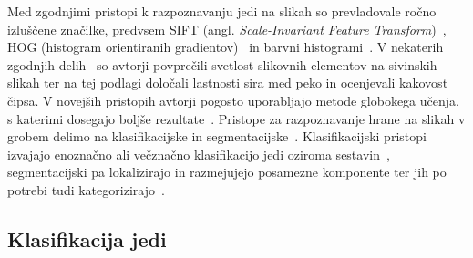 \documentclass[a4paper,twoside,openright,12pt,slovene]{book}
\begin{document}
        Med zgodnjimi pristopi k razpoznavanju jedi na slikah so prevladovale
        ročno izluščene značilke, predvsem SIFT (angl. \emph{Scale-Invariant
        Feature Transform})~\cite{src:lowe2004sift}, HOG (histogram
        orientiranih gradientov)~\cite{src:dalal2005hog} in barvni
        histogrami~\cite{src:min2019survey}.
        V nekaterih zgodnjih delih~\cite{src:wang2003assessment,
        src:segnini1999low} so avtorji povprečili svetlost slikovnih elementov
        na sivinskih slikah ter na tej podlagi določali lastnosti sira med peko
        in ocenjevali kakovost čipsa.
        V novejših pristopih avtorji pogosto uporabljajo metode globokega
        učenja, s katerimi dosegajo boljše rezultate~\cite{src:min2019survey,
        src:kagaya2014food, src:krizhevsky2012imagenet,
        src:hassannejad2016food, src:martinel2018wide}.
        Pristope za razpoznavanje hrane na slikah v grobem delimo na
        klasifikacijske in
        segmentacijske~\cite{src:konstantakopoulos2023review,
        src:min2019survey}. Klasifikacijski pristopi izvajajo enoznačno ali večznačno
        klasifikacijo jedi oziroma sestavin~\cite{src:martinel2018wide,
        src:tan2019efficientnet, src:bolanos2017food, src:fu2024recognizing},
        segmentacijski pa lokalizirajo in razmejujejo posamezne komponente ter
        jih po potrebi tudi kategorizirajo~\cite{src:wu2021large,
        src:bolanos2016simultaneous, src:poply2021refined,
        src:konstantakopoulos2023review, src:javadi2024smart}.

        \subsection{Klasifikacija jedi}
\end{document}
